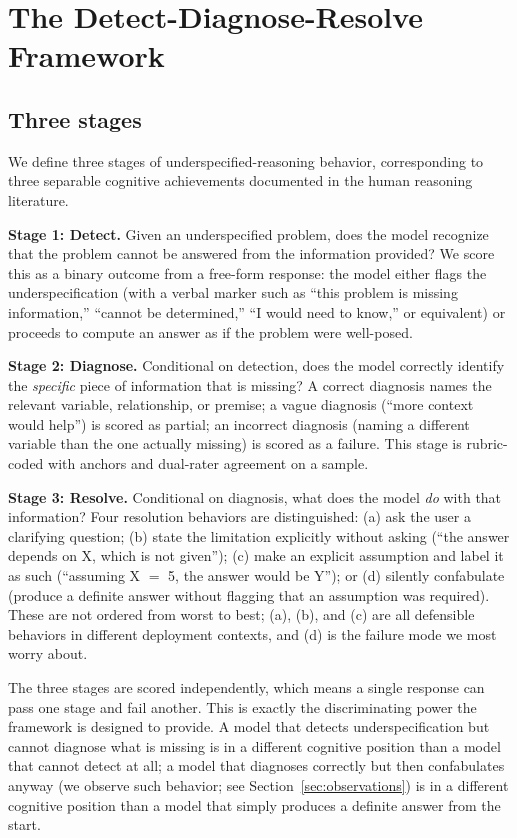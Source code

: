 \documentclass[11pt,letterpaper]{article}
\begin{document}
\section{The Detect-Diagnose-Resolve Framework}
\label{sec:framework}

\subsection{Three stages}

We define three stages of underspecified-reasoning behavior, corresponding to three separable cognitive achievements documented in the human reasoning literature.

\textbf{Stage 1: Detect.} Given an underspecified problem, does the model recognize that the problem cannot be answered from the information provided? We score this as a binary outcome from a free-form response: the model either flags the underspecification (with a verbal marker such as ``this problem is missing information,'' ``cannot be determined,'' ``I would need to know,'' or equivalent) or proceeds to compute an answer as if the problem were well-posed.

\textbf{Stage 2: Diagnose.} Conditional on detection, does the model correctly identify the \emph{specific} piece of information that is missing? A correct diagnosis names the relevant variable, relationship, or premise; a vague diagnosis (``more context would help'') is scored as partial; an incorrect diagnosis (naming a different variable than the one actually missing) is scored as a failure. This stage is rubric-coded with anchors and dual-rater agreement on a sample.

\textbf{Stage 3: Resolve.} Conditional on diagnosis, what does the model \emph{do} with that information? Four resolution behaviors are distinguished: (a) ask the user a clarifying question; (b) state the limitation explicitly without asking (``the answer depends on X, which is not given''); (c) make an explicit assumption and label it as such (``assuming X $=$ 5, the answer would be Y''); or (d) silently confabulate (produce a definite answer without flagging that an assumption was required). These are not ordered from worst to best; (a), (b), and (c) are all defensible behaviors in different deployment contexts, and (d) is the failure mode we most worry about.

The three stages are scored independently, which means a single response can pass one stage and fail another. This is exactly the discriminating power the framework is designed to provide. A model that detects underspecification but cannot diagnose what is missing is in a different cognitive position than a model that cannot detect at all; a model that diagnoses correctly but then confabulates anyway (we observe such behavior; see Section~\ref{sec:observations}) is in a different cognitive position than a model that simply produces a definite answer from the start.
\end{document}

